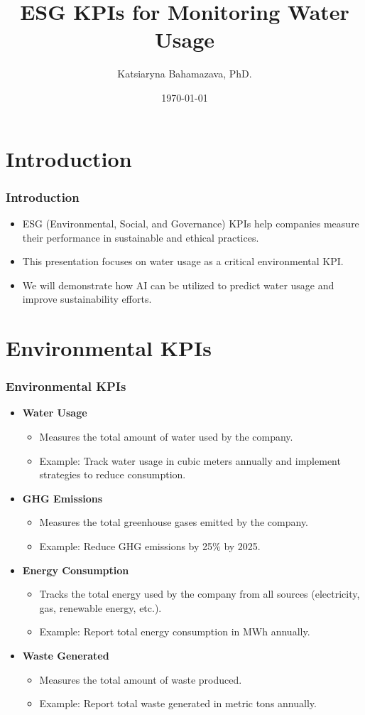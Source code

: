 \documentclass{beamer}
\title{ESG KPIs for Monitoring Water Usage}
\author{Katsiaryna Bahamazava, PhD.}
\institute{Mathematical Department of Politecnico di Torino}
\date{\today}
\begin{document}
\frame{\titlepage}

\section{Introduction}

\begin{frame}
\frametitle{Introduction}
\begin{itemize}
    \item ESG (Environmental, Social, and Governance) KPIs help companies measure their performance in sustainable and ethical practices.
    \item This presentation focuses on water usage as a critical environmental KPI.
    \item We will demonstrate how AI can be utilized to predict water usage and improve sustainability efforts.
\end{itemize}
\end{frame}

\section{Environmental KPIs}

\begin{frame}
\frametitle{Environmental KPIs}
\begin{itemize}
    \item \textbf{Water Usage}
        \begin{itemize}
            \item Measures the total amount of water used by the company.
            \item Example: Track water usage in cubic meters annually and implement strategies to reduce consumption.
        \end{itemize}
    \item \textbf{GHG Emissions}
        \begin{itemize}
            \item Measures the total greenhouse gases emitted by the company.
            \item Example: Reduce GHG emissions by 25\% by 2025.
        \end{itemize}
    \item \textbf{Energy Consumption}
        \begin{itemize}
            \item Tracks the total energy used by the company from all sources (electricity, gas, renewable energy, etc.).
            \item Example: Report total energy consumption in MWh annually.
        \end{itemize}
    \item \textbf{Waste Generated}
        \begin{itemize}
            \item Measures the total amount of waste produced.
            \item Example: Report total waste generated in metric tons annually.
        \end{itemize}
\end{itemize}
\end{frame}
\end{document}
